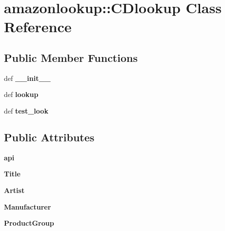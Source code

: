 \hypertarget{classamazonlookup_1_1CDlookup}{
\section{amazonlookup::CDlookup Class Reference}
\label{classamazonlookup_1_1CDlookup}
}
\subsection*{Public Member Functions}
\begin{DoxyCompactItemize}
\item 
\hypertarget{classamazonlookup_1_1CDlookup_a0f084f938ca57c42259ab0508532430f}{
def {\bfseries \_\-\_\-init\_\-\_\-}}
\label{classamazonlookup_1_1CDlookup_a0f084f938ca57c42259ab0508532430f}

\item 
\hypertarget{classamazonlookup_1_1CDlookup_a786e0e61df1a65adab5a6a2288b5faf4}{
def {\bfseries lookup}}
\label{classamazonlookup_1_1CDlookup_a786e0e61df1a65adab5a6a2288b5faf4}

\item 
\hypertarget{classamazonlookup_1_1CDlookup_a2af60d53ad99f6c890c96f3dd3c5ce81}{
def {\bfseries test\_\-look}}
\label{classamazonlookup_1_1CDlookup_a2af60d53ad99f6c890c96f3dd3c5ce81}

\end{DoxyCompactItemize}
\subsection*{Public Attributes}
\begin{DoxyCompactItemize}
\item 
\hypertarget{classamazonlookup_1_1CDlookup_a1e8fb9e5583aad3182172e4efc0ec958}{
{\bfseries api}}
\label{classamazonlookup_1_1CDlookup_a1e8fb9e5583aad3182172e4efc0ec958}

\item 
\hypertarget{classamazonlookup_1_1CDlookup_a0582e9a5ec100fbcb1400e4ad6ffce9a}{
{\bfseries Title}}
\label{classamazonlookup_1_1CDlookup_a0582e9a5ec100fbcb1400e4ad6ffce9a}

\item 
\hypertarget{classamazonlookup_1_1CDlookup_a4031130dd141dc8cbe6faa3a8f266193}{
{\bfseries Artist}}
\label{classamazonlookup_1_1CDlookup_a4031130dd141dc8cbe6faa3a8f266193}

\item 
\hypertarget{classamazonlookup_1_1CDlookup_a8ce7e909845b6e3e01fa38109b23eb68}{
{\bfseries Manufacturer}}
\label{classamazonlookup_1_1CDlookup_a8ce7e909845b6e3e01fa38109b23eb68}

\item 
\hypertarget{classamazonlookup_1_1CDlookup_a0677fee5bd040cad01fa708add5d764b}{
{\bfseries ProductGroup}}
\label{classamazonlookup_1_1CDlookup_a0677fee5bd040cad01fa708add5d764b}

\end{DoxyCompactItemize}



